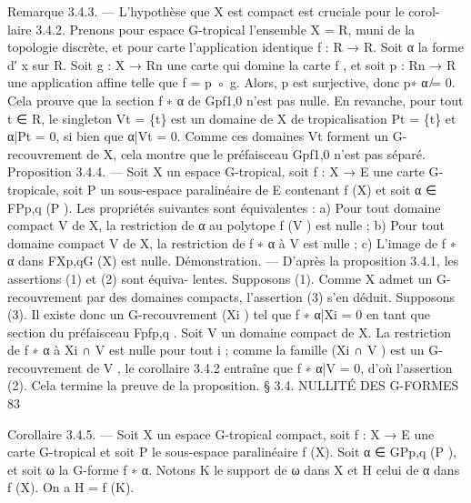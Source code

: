 \documentclass[
  10pt,
]{article}
\newenvironment{Shaded}{}{}
\newcommand{\NormalTok}[1]{#1}
\begin{document}
\begin{Shaded}
\begin{Highlighting}[]
\NormalTok{Remarque 3.4.3. — L’hypothèse que X est compact est cruciale pour le corol{-}}
\NormalTok{laire 3.4.2.}
\NormalTok{   Prenons pour espace G{-}tropical l’ensemble X = R, muni de la topologie discrète, et}
\NormalTok{pour carte l’application identique f : R → R. Soit α la forme d′ x sur R. Soit g : X → Rn}
\NormalTok{une carte qui domine la carte f , et soit p : Rn → R une application affine telle que}
\NormalTok{f = p ◦ g. Alors, p est surjective, donc p∗ α ̸= 0. Cela prouve que la section f ∗ α de Gpf1,0}
\NormalTok{n’est pas nulle. En revanche, pour tout t ∈ R, le singleton Vt = \{t\} est un domaine de X}
\NormalTok{de tropicalisation Pt = \{t\} et α|Pt = 0, si bien que α|Vt = 0. Comme ces domaines Vt}
\NormalTok{forment un G{-}recouvrement de X, cela montre que le préfaisceau Gpf1,0 n’est pas séparé.}
\NormalTok{Proposition 3.4.4. — Soit X un espace G{-}tropical, soit f : X → E une carte G{-}}
\NormalTok{tropicale, soit P un sous{-}espace paralinéaire de E contenant f (X) et soit α ∈ FPp,q (P ).}
\NormalTok{   Les propriétés suivantes sont équivalentes :}
\NormalTok{   a) Pour tout domaine compact V de X, la restriction de α au polytope f (V ) est nulle ;}
\NormalTok{   b) Pour tout domaine compact V de X, la restriction de f ∗ α à V est nulle ;}
\NormalTok{   c) L’image de f ∗ α dans FXp,qG (X) est nulle.}
\NormalTok{Démonstration. — D’après la proposition 3.4.1, les assertions (1) et (2) sont équiva{-}}
\NormalTok{lentes.}
\NormalTok{   Supposons (1). Comme X admet un G{-}recouvrement par des domaines compacts,}
\NormalTok{l’assertion (3) s’en déduit.}
\NormalTok{   Supposons (3). Il existe donc un G{-}recouvrement (Xi ) tel que f ∗ α|Xi = 0 en tant que}
\NormalTok{section du préfaisceau Fpfp,q . Soit V un domaine compact de X. La restriction de f ∗ α}
\NormalTok{à Xi ∩ V est nulle pour tout i ; comme la famille (Xi ∩ V ) est un G{-}recouvrement de V ,}
\NormalTok{le corollaire 3.4.2 entraîne que f ∗ α|V = 0, d’où l’assertion (2). Cela termine la preuve}
\NormalTok{de la proposition.}
\NormalTok{                                § 3.4. NULLITÉ DES G{-}FORMES                                83}

\NormalTok{Corollaire 3.4.5. — Soit X un espace G{-}tropical compact, soit f : X → E une carte}
\NormalTok{G{-}tropical et soit P le sous{-}espace paralinéaire f (X). Soit α ∈ GPp,q (P ), et soit ω la}
\NormalTok{G{-}forme f ∗ α. Notons K le support de ω dans X et H celui de α dans f (X). On a}
\NormalTok{H = f (K).}


\end{Highlighting}
\end{Shaded}
\end{document}
